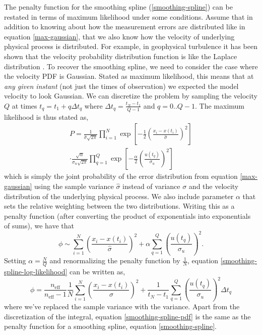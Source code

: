 \documentclass[10pt,journal]{IEEEtran}
\begin{document}
The penalty function for the smoothing spline (\ref{smoothing-spline}) can be restated in terms of maximum likelihood under some conditions. Assume that in addition to knowing about how the measurement errors are distributed like in equation \ref{max-gaussian}, that we also know how the velocity of underlying physical process is distributed. For example, in geophysical turbulence it has been shown that the velocity probability distribution function is like the Laplace distribution \cite{bracco2000-pf}. To recover the smoothing spline, we need to consider the case where the velocity PDF is Gaussian. Stated as maximum likelihood, this means that at \emph{any given instant} (not just the times of observation) we expected the model velocity to look Gaussian. We can discretize the problem by sampling the velocity $Q$ at times $t_q = t_1 + q \Delta t_q$ where $\Delta t_q=\frac{t_N-t_1}{Q-1}$ and $q=0..Q-1$. The maximum likelihood is thus stated as,
\begin{equation}
\label{gaussian-max-likelihood}
\begin{split}
P =  \frac{1}{\hat{\sigma} \sqrt{2 \pi}} \prod^N _{i=1}\exp \left[ -\frac{1}{2} \left( \frac{x_i - x(t_i)}{\hat{\sigma}} \right)^2 \right] \\\cdot \frac{\sqrt{\alpha}}{\sigma_u \sqrt{2 \pi}} \prod^{Q}_{q=1} \exp \left[  - \frac{\alpha}{2} \left(  \frac{u(t_q)}{\sigma_u} \right)^2 \right]
\end{split}
\end{equation}
which is simply the joint probability of the error distribution from equation \ref{max-gaussian} using the sample variance $\hat{\sigma}$ instead of variance $\sigma$ and the velocity distribution of the underlying physical process. We also include parameter $\alpha$ that sets the relative weighting between the two distributions. Writing this as a penalty function (after converting the product of exponentials into exponentials of sums), we have that
\begin{equation}
\label{smoothing-spline-log-likelihood}
\phi \sim  \sum^N _{i=1}  \left( \frac{x_i - x(t_i)}{\hat{\sigma}} \right)^2 + \alpha \sum^{Q}_{q=1} \left( \frac{u(t_q)}{\sigma_u} \right)^2.
\end{equation}
Setting $\alpha=\frac{N}{Q}$ and renormalizing the penalty function by $\frac{1}{N}$, equation \ref{smoothing-spline-log-likelihood} can be written as,
\begin{equation}
\label{smoothing-spline-pdf}
\phi =\frac{n_{\textrm{eff}}}{n_{\textrm{eff}}-1}  \frac{1}{N} \sum^N _{i=1}  \left( \frac{x_i - x(t_i)}{\sigma} \right)^2 + \frac{1}{t_N-t_1} \sum^{Q}_{q=1}  \left(  \frac{u(t_q)}{\sigma_u} \right)^2 \Delta t_q
\end{equation}
where we've replaced the sample variance with the variance.
Apart from the discretization of the integral, equation \ref{smoothing-spline-pdf} is the same as the penalty function for a smoothing spline, equation \ref{smoothing-spline}.
\end{document}

